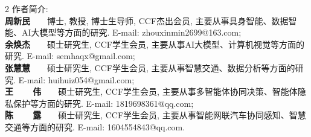 \begin{multicols}{2}
 \vskip 2pt
\noindent
{ 作者简介:}\\
 {\scriptsize
\indent \textbf{周新民}~~~~博士, 教授, 博士生导师, CCF杰出会员, 主要从事具身智能、数据智能、AI大模型等方面的研究. E-mail: \mbox{zhouxinmin2699@163.com};\\
\indent \textbf{余焕杰}~~~~硕士研究生, CCF学生会员, 主要从事AI大模型、计算机视觉等方面的研究. E-mail: \mbox{semhaqx@gmail.com};\\
\indent \textbf{张慧慧}~~~~硕士研究生, CCF学生会员, 主要从事智慧交通、数据分析等方面的研究. E-mail: \mbox{huihuiz054@gmail.com};\\
\indent \textbf{王~~~~伟}~~~~硕士研究生, CCF学生会员, 主要从事多智能体协同决策、智能体隐私保护等方面的研究. E-mail: \mbox{1819698361@qq.com};\\
\indent \textbf{陈~~~~露}~~~~硕士研究生, CCF学生会员, 主要从事智能网联汽车协同感知、智慧交通等方面的研究. E-mail: \mbox{1604554843@qq.com}.}
\end{multicols}

